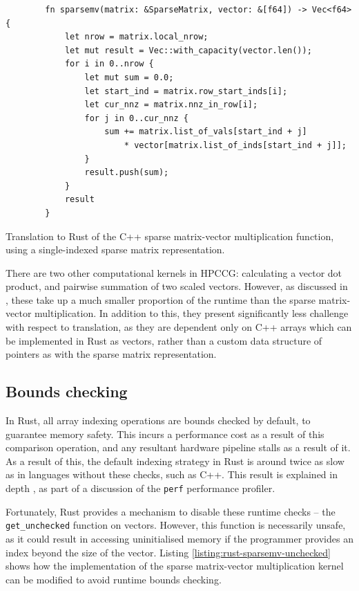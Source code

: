 \begin{listing}[H]
    \begin{verbatim}
        fn sparsemv(matrix: &SparseMatrix, vector: &[f64]) -> Vec<f64> {
            let nrow = matrix.local_nrow;
            let mut result = Vec::with_capacity(vector.len());
            for i in 0..nrow {
                let mut sum = 0.0;
                let start_ind = matrix.row_start_inds[i];
                let cur_nnz = matrix.nnz_in_row[i];
                for j in 0..cur_nnz {
                    sum += matrix.list_of_vals[start_ind + j]
                        * vector[matrix.list_of_inds[start_ind + j]];
                }
                result.push(sum);
            }
            result
        }
    \end{verbatim}
    \caption{Translation to Rust of the C++ sparse matrix-vector multiplication function, using a single-indexed sparse matrix representation.}
    \label{listing:rust-sparsemv-indexed}
\end{listing}

There are two other computational kernels in \acrshort{HPCCG}: calculating a vector dot product, and pairwise summation of two scaled vectors. However, as discussed in , these take up a much smaller proportion of the runtime than the sparse matrix-vector multiplication. In addition to this, they present significantly less challenge with respect to translation, as they are dependent only on C++ arrays which can be implemented in Rust as vectors, rather than a custom data structure of pointers as with the sparse matrix representation.

\subsection{Bounds checking}
\label{sec:translation-bounds-checking}

In Rust, all array indexing operations are bounds checked by default, to guarantee memory safety. This incurs a performance cost as a result of this comparison operation, and any resultant hardware pipeline stalls as a result of it. As a result of this, the default indexing strategy in Rust is around twice as slow as in languages without these checks, such as C++. This result is explained in depth , as part of a discussion of the \texttt{perf} performance profiler.

Fortunately, Rust provides a mechanism to disable these runtime checks -- the \texttt{get_unchecked} function on vectors. However, this function is necessarily unsafe, as it could result in accessing uninitialised memory if the programmer provides an index beyond the size of the vector. Listing \ref{listing:rust-sparsemv-unchecked} shows how the implementation of the sparse matrix-vector multiplication kernel can be modified to avoid runtime bounds checking.

